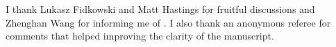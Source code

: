 \documentclass[aps,pra,
floatfix,notitlepage,
nofootinbib,
longbibliography,11pt]{revtex4-1}
\theoremstyle{definition}
\begin{document}
\begin{acknowledgments}
I thank Lukasz Fidkowski and Matt Hastings for fruitful discussions 
and Zhenghan Wang for informing me of \cite{Galindo2016}.
I also thank an anonymous referee for comments 
that helped improving the clarity of the manuscript.
\end{acknowledgments}



\end{document}
